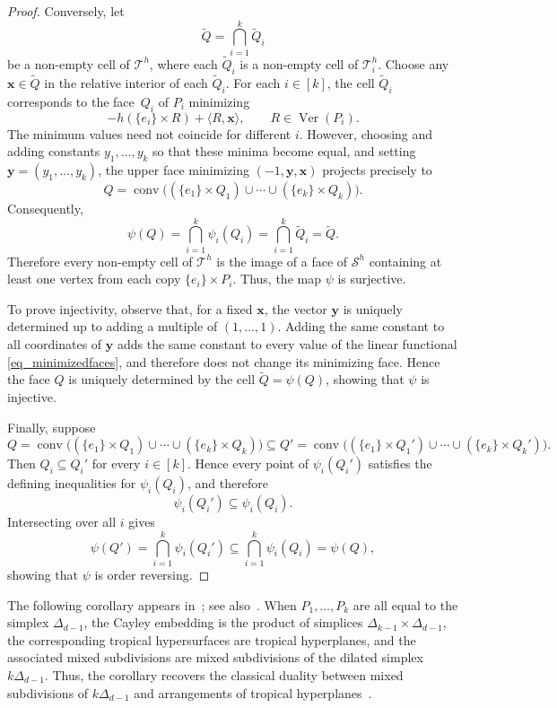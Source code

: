 \documentclass[12pt, reqno]{amsart}
\theoremstyle{plain}
\theoremstyle{definition}
\numberwithin{equation}{section}
\begin{document}
\begin{proof}
Conversely, let
\[
\tilde Q=\bigcap_{i=1}^k\tilde Q_i
\]
be a non-empty cell of $\mathscr{T}^h$, where each $\tilde Q_i$ is a non-empty cell of $\mathcal{T}_i^h$. Choose any $\mathbf{x}\in\tilde Q$ in the relative interior of each $\tilde Q_i$. For each $i\in[k]$, the cell $\tilde Q_i$ corresponds to the face~$Q_i$ of $P_i$ minimizing
\[
-h(\{e_i\}\times R)+\langle R,\mathbf{x}\rangle,
\qquad
R\in\operatorname{Ver}(P_i).
\]
The minimum values need not coincide for different $i$. However, choosing and adding constants $y_1,\dots,y_k$ so that these minima become equal, and setting $\mathbf{y}=(y_1,\dots,y_k)$, the upper face minimizing $(-1,\mathbf{y},\mathbf{x})$ projects precisely to
\[
Q=
\operatorname{conv}\bigl((\{e_1\}\times Q_1)\cup\cdots\cup(\{e_k\}\times Q_k)\bigr).
\]
Consequently,
\[
\psi(Q)
=\bigcap_{i=1}^k\psi_i(Q_i)
=\bigcap_{i=1}^k\tilde Q_i
=\tilde Q.
\]
Therefore every non-empty cell of $\mathscr{T}^h$ is the image of a face of $\mathcal{S}^h$ containing at least one vertex from each copy $\{e_i\}\times P_i$. Thus, the map $\psi$ is surjective.

To prove injectivity, observe that, for a fixed $\mathbf{x}$, the vector $\mathbf{y}$ is uniquely determined up to adding a multiple of $(1,\dots,1)$. Adding the same constant to all coordinates of $\mathbf{y}$ adds the same constant to every value of the linear functional \eqref{eq_minimizedfaces}, and therefore does not change its minimizing face. Hence the face $Q$ is uniquely determined by the cell $\tilde Q=\psi(Q)$, showing that $\psi$ is injective.

Finally, suppose
\[
Q=
\operatorname{conv}\bigl((\{e_1\}\times Q_1)\cup\cdots\cup(\{e_k\}\times Q_k)\bigr)
\subseteq
Q'=
\operatorname{conv}\bigl((\{e_1\}\times Q_1')\cup\cdots\cup(\{e_k\}\times Q_k')\bigr).
\]
Then $Q_i\subseteq Q_i'$ for every $i\in[k]$. Hence every point of $\psi_i(Q_i')$ satisfies the defining inequalities for $\psi_i(Q_i)$, and therefore
\[
\psi_i(Q_i')\subseteq\psi_i(Q_i).
\]
Intersecting over all $i$ gives
\[
\psi(Q')
=
\bigcap_{i=1}^k\psi_i(Q_i')
\subseteq
\bigcap_{i=1}^k\psi_i(Q_i)
=
\psi(Q),
\]
showing that $\psi$ is order reversing.
\end{proof}

The following corollary appears in~\cite[Corollary~4.9]{joswig_essentials_tropical_2021}; see also~\cite[Theorem~5.3]{d2023realizing}. When $P_1,\dots,P_k$ are all equal to the simplex $\Delta_{d-1}$, the Cayley embedding is the product of simplices \(\Delta_{k-1}\times\Delta_{d-1}\), the corresponding tropical hypersurfaces are tropical hyperplanes, and the associated mixed subdivisions are mixed subdivisions of the dilated simplex~\(k\Delta_{d-1}\). Thus, the corollary recovers the classical duality between mixed subdivisions of \(k\Delta_{d-1}\) and arrangements of tropical hyperplanes~\cite{santos2005cayley,develin_tropicalConvexity_2004,fink_stiefel_2015}.
\end{document}
